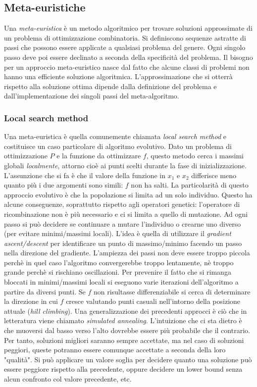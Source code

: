 \documentclass[10pt,a4paper]{article}
\begin{document}
\subsection{Meta-euristiche}

Una \emph{meta-euristica} è un metodo algoritmico per trovare soluzioni approssimate di un problema di ottimizzazione combinatoria. Si definiscono sequenze astratte di passi che possono essere applicate a qualsiasi problema del genere. Ogni singolo passo deve poi essere declinato a seconda della specificità del problema. Il bisogno per un approccio meta-euristico nasce dal fatto che alcune classi di problemi non hanno una efficiente soluzione algoritmica. L'approssimazione che si otterrà rispetto alla soluzione ottima dipende dalla definizione del problema e dall'implementazione dei singoli passi del meta-algoritmo.

\subsubsection{Local search method}

Una meta-euristica è quella comunemente chiamata \emph{local search method} e costituisce un caso particolare di algoritmo evolutivo. Dato un problema di ottimizzazione $P$ e la funzione da ottimizzare $f$, questo metodo cerca i massimi globali \emph{localmente}, attorno cioè ai punti scelti durante la fase di inizializzazione. L'assunzione che si fa è che il valore della funzione in $x_1$ e $x_2$ differisce meno quanto più i due argomenti sono simili: $f$ non ha salti. 
La particolarità di questo approccio evolutivo è che la popolazione si limita ad un solo individuo. Questo ha alcune conseguenze, soprattutto rispetto agli operatori genetici: l'operatore di ricombinazione non è più necessario e ci si limita a quello di mutazione. Ad ogni passo si può decidere se continuare a mutare l'individuo o crearne uno diverso (per evitare minimi/massimi locali). L'idea è quella di utilizzare il \emph{gradient ascent/descent} per identificare un punto di massimo/minimo facendo un passo nella direzione del gradiente. L'ampiezza dei passi non deve essere troppo piccola perchè in quel caso l'algoritmo convergerebbe troppo lentamente, nè troppo grande perchè si rischiano oscillazioni. Per prevenire il fatto che si rimanga bloccati in minimi/massimi locali si eseguono varie iterazioni dell'algoritmo a partire da diversi punti. Se $f$ non risultasse differenziabile si cerca di determinare la direzione in cui $f$ cresce valutando punti casuali nell'intorno della posizione attuale (\emph{hill climbing}). Una generalizzazione dei precedenti approcci è ciò che in letteratura viene chiamato \emph{simulated annealing}. L'intuizione che ci sta dietro è che muoversi dal basso verso l'alto dovrebbe essere più probabile che il contrario. Per tanto, soluzioni migliori saranno sempre accettate, ma nel caso di soluzioni peggiori, queste potranno essere comunque accettate a seconda della loro "qualità". Si può applicare un valore soglia per decidere quanto una soluzione può essere peggiore rispetto alla precedente, oppure decidere un lower bound senza alcun confronto col valore precedente, etc.
\end{document}
